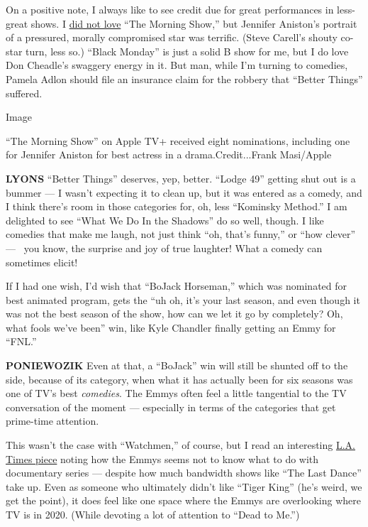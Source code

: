 On a positive note, I always like to see credit due for great
performances in less-great shows. I
\href{https://www.nytimes3xbfgragh.onion/2019/10/30/arts/television/the-morning-show-apple.html}{did
not love} ``The Morning Show,'' but Jennifer Aniston's portrait of a
pressured, morally compromised star was terrific. (Steve Carell's shouty
co-star turn, less so.) ``Black Monday'' is just a solid B show for me,
but I do love Don Cheadle's swaggery energy in it. But man, while I'm
turning to comedies, Pamela Adlon should file an insurance claim for the
robbery that ``Better Things'' suffered.

Image

``The Morning Show'' on Apple TV+ received eight nominations, including
one for Jennifer Aniston for best actress in a drama.Credit...Frank
Masi/Apple

\textbf{LYONS} ``Better Things'' deserves, yep, better. ``Lodge 49''
getting shut out is a bummer --- I wasn't expecting it to clean up, but
it was entered as a comedy, and I think there's room in those categories
for, oh, less ``Kominsky Method.'' I am delighted to see ``What We Do In
the Shadows'' do so well, though. I like comedies that make me laugh,
not just think ``oh, that's funny,'' or ``how clever'' ---~ you know,
the surprise and joy of true laughter! What a comedy can sometimes
elicit!

If I had one wish, I'd wish that ``BoJack Horseman,'' which was
nominated for best animated program, gets the ``uh oh, it's your last
season, and even though it was not the best season of the show, how can
we let it go by completely? Oh, what fools we've been'' win, like Kyle
Chandler finally getting an Emmy for ``FNL.''

\textbf{PONIEWOZIK} Even at that, a ``BoJack'' win will still be shunted
off to the side, because of its category, when what it has actually been
for six seasons was one of TV's best \emph{comedies}. The Emmys often
feel a little tangential to the TV conversation of the moment ---
especially in terms of the categories that get prime-time attention.

This wasn't the case with ``Watchmen,'' of course, but I read an
interesting
\href{https://www.latimes.com/entertainment-arts/tv/story/2020-07-27/emmys-2020-nominations-tiger-king-the-last-dance-cheer-mcmillions}{L.A.
Times piece} noting how the Emmys seems not to know what to do with
documentary series --- despite how much bandwidth shows like ``The Last
Dance'' take up. Even as someone who ultimately didn't like ``Tiger
King'' (he's weird, we get the point), it does feel like one space where
the Emmys are overlooking where TV is in 2020. (While devoting a lot of
attention to ``Dead to Me.'')

